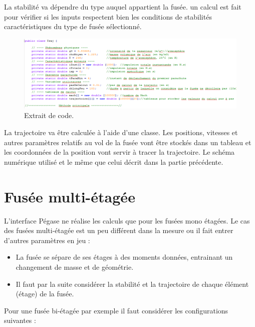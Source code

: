 \documentclass[a4paper]{article}
\begin{document}
La stabilité va dépendre du type auquel appartient la fusée. un calcul est fait pour vérifier si les inputs respectent bien les conditions de stabilités caractéristiques du type de fusée sélectionné.\\

\newpage

\begin{figure}[!htbp]
\begin{center}
\includegraphics[width=15cm]{code.PNG} 
\end{center}
\caption{Extrait de code.}
\end{figure}

La trajectoire va être calculée à l'aide d'une classe. Les positions, vitesses et autres paramètres relatifs au vol de la fusée vont être stockés dans un tableau et les coordonnées de la position vont servir à tracer la trajectoire. Le schéma numérique utilisé et le même que celui décrit dans la partie précédente.



\section{Fusée multi-étagée}

L'interface Pégase ne réalise les calculs que pour les fusées mono étagées. Le cas des fusées multi-étagée est un peu différent dans la mesure ou il fait entrer d'autres paramètres en jeu : \\

\begin{itemize}
\item La fusée se sépare de ses étages à des moments données, entrainant un changement de masse et de géométrie.
\item Il faut par la suite considérer la stabilité et la trajectoire de chaque élément (étage) de la fusée.
\end{itemize}

Pour une fusée bi-étagée par exemple il faut considérer les configurations suivantes : 
\end{document}
